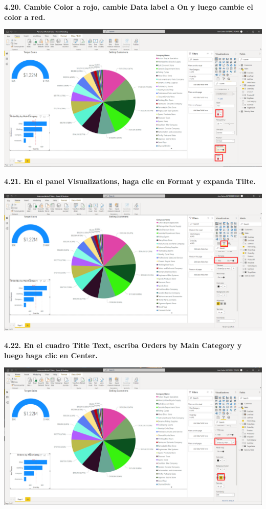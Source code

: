 \documentclass{article}
\begin{document}
\textbf{4.20. Cambie \textbf{Color} a rojo, cambie \textbf{Data label} a \textbf{On} y luego cambie el color a \textbf{red}.}

    \begin{center}
		\includegraphics[width=14cm]{./images/96} 
	\end{center}

\newpage
\textbf{4.21. En el panel \textbf{Visualizations}, haga clic en \textbf{Format} y expanda \textbf{Tilte}.}

    \begin{center}
		\includegraphics[width=14cm]{./images/97} 
	\end{center}


\textbf{4.22. En el cuadro \textbf{Title Text}, escriba \textbf{Orders by Main Category} y luego haga clic en \textbf{Center}.}

    \begin{center}
		\includegraphics[width=14cm]{./images/98} 
	\end{center}
\end{document}
